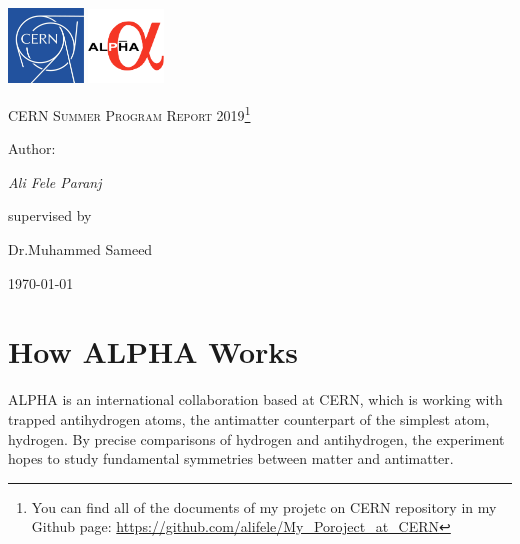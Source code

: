 \documentclass[12pt,a4paper]{article}
\begin{document}
\begin{titlepage}
	\centering
	\includegraphics[width=0.15\textwidth]{cern}\hspace{50mm}
\includegraphics[width=0.15\textwidth]{Alpha}	
	
	\par\vspace{1cm}
	{\scshape\LARGE CERN Summer Program Report 2019\footnote{You can find all of the documents of my projetc on CERN repository in my Github page: \url{https://github.com/alifele/My_Poroject_at_CERN}} \par}
	\vspace{1cm}
	
	\vspace{1.5cm}
	
	\vspace{2cm}
	\begin{Large}
	Author:
	\end{Large} \par
	{\Large\itshape Ali Fele Paranj \par}
	\vspace{30mm}
	supervised by\par
	Dr.Muhammed Sameed
	\vfill
	{\large \today\par}

\end{titlepage}



\newpage

\tableofcontents

\newpage

\section{How ALPHA Works}

ALPHA is an international  collaboration based at CERN, which is working with trapped antihydrogen atoms, the antimatter counterpart of the simplest atom, hydrogen. By precise comparisons of hydrogen and antihydrogen, the experiment hopes to study fundamental symmetries between matter and antimatter. 
\end{document}
